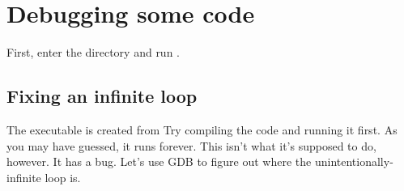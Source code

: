 \documentclass{tufte-handout}
\begin{document}
\vfill\eject
\section{Debugging some code}

First, enter the  directory and run .

\subsection{Fixing an infinite loop}

The executable  is created from 
Try compiling the code and running it first. As you may have guessed, it runs
forever.
%
%
This isn't what it's supposed to do, however. It has a bug. Let's use GDB to
figure out where the unintentionally-infinite loop is.
\end{document}
